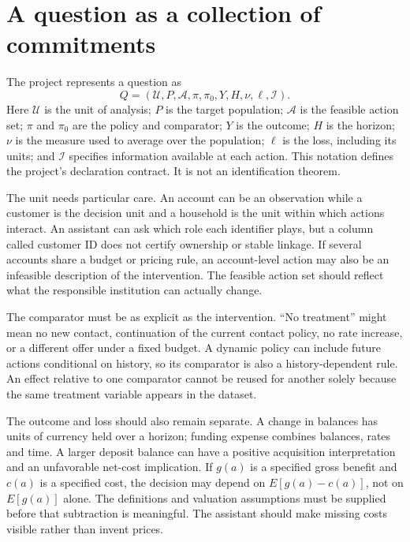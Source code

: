 \section{A question as a collection of commitments}

The project represents a question as
\begin{equation}
 Q=(\mathcal U,P,\mathcal A,\pi,\pi_0,Y,H,\nu,\ell,\mathcal I).
 \label{la:question}
\end{equation}
Here \(\mathcal U\) is the unit of analysis; \(P\) is the target population;
\(\mathcal A\) is the feasible action set; \(\pi\) and \(\pi_0\) are the
policy and comparator; \(Y\) is the outcome; \(H\) is the horizon; \(\nu\)
is the measure used to average over the population; \(\ell\) is the loss,
including its units; and \(\mathcal I\) specifies information available at
each action. This notation defines the project's declaration contract. It is
not an identification theorem.

The unit needs particular care. An account can be an observation while a
customer is the decision unit and a household is the unit within which actions
interact. An assistant can ask which role each identifier plays, but a column
called customer ID does not certify ownership or stable linkage. If several
accounts share a budget or pricing rule, an account-level action may also be
an infeasible description of the intervention. The feasible action set should
reflect what the responsible institution can actually change.

The comparator must be as explicit as the intervention. ``No treatment'' might
mean no new contact, continuation of the current contact policy, no rate
increase, or a different offer under a fixed budget. A dynamic policy can
include future actions conditional on history, so its comparator is also a
history-dependent rule. An effect relative to one comparator cannot be
reused for another solely because the same treatment variable appears in the
dataset.

The outcome and loss should also remain separate. A change in balances has
units of currency held over a horizon; funding expense combines balances,
rates and time. A larger deposit balance can have a positive acquisition
interpretation and an unfavorable net-cost implication. If \(g(a)\) is a
specified gross benefit and \(c(a)\) is a specified cost, the decision may
depend on \(E[g(a)-c(a)]\), not on \(E[g(a)]\) alone. The definitions and
valuation assumptions must be supplied before that subtraction is meaningful.
The assistant should make missing costs visible rather than invent prices.

